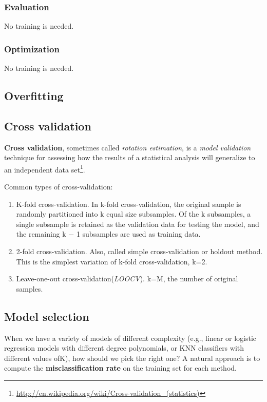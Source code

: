 \subsubsection{Evaluation}
No training is needed.

\subsubsection{Optimization}
No training is needed.


\subsection{Overfitting}


\subsection{Cross validation}
\label{sec:Cross-validation}
\begin{definition}
\textbf{Cross validation}, sometimes called \emph{rotation estimation}, is a \emph{model validation} technique for assessing how the results of a statistical analysis will generalize to an independent data set\footnote{\url{http://en.wikipedia.org/wiki/Cross-validation_(statistics)}}.
\end{definition}

Common types of cross-validation:
\begin{enumerate}
\item K-fold cross-validation. In k-fold cross-validation, the original sample is randomly partitioned into k equal size subsamples. Of the k subsamples, a single subsample is retained as the validation data for testing the model, and the remaining k − 1 subsamples are used as training data.
\item 2-fold cross-validation. Also, called simple cross-validation or holdout method. This is the simplest variation of k-fold cross-validation, k=2.
\item Leave-one-out cross-validation(\emph{LOOCV}). k=M, the number of original samples.
\end{enumerate}


\subsection{Model selection}
When we have a variety of models of different complexity (e.g., linear or logistic regression models with different degree polynomials, or KNN classifiers with different values ofK), how should we pick the right one? A natural approach is to compute the \textbf{misclassification rate} on the training set for each method.


